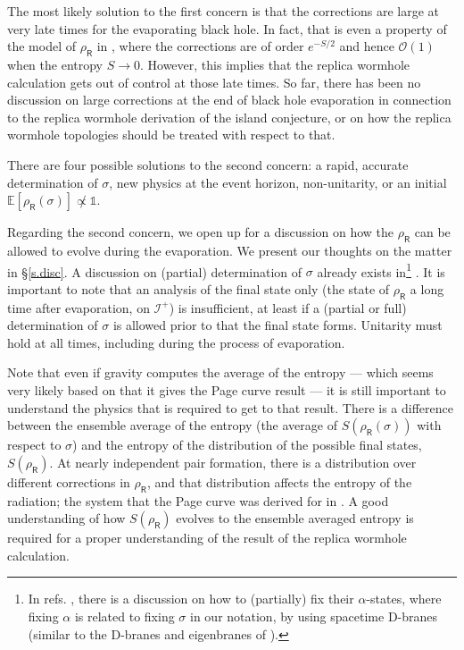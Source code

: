 \documentclass[11pt]{article}
\numberwithin{equation}{section}
\begin{document}
The most likely solution to the first concern is that the corrections are large at very late times for the evaporating black hole. In fact, that is even a property of the model of $\rho_\textsf{R}$ in \cite{Penington:2019kki}, where the corrections are of order $e^{-S/2}$ and hence $\mathcal{O}(1)$ when the entropy $S\rightarrow0$. However, this implies that the replica wormhole calculation gets out of control at those late times. So far, there has been no discussion on large corrections at the end of black hole evaporation in connection to the replica wormhole derivation of the island conjecture, or on how the replica wormhole topologies should be treated with respect to that.

There are four possible solutions to the second concern: a rapid, accurate determination of $\sigma$, new physics at the event horizon, non-unitarity, or an initial $\mathbb{E}[\rho_\textsf{R}(\sigma)]\not\propto \mathbb{1}$.

Regarding the second concern, we open up for a discussion on how the $\rho_\textsf{R}$ can be allowed to evolve during the evaporation. We present our thoughts on the matter in \S\ref{s.disc}. A discussion on (partial) determination of $\sigma$ already exists in\footnote{In refs. \cite{Marolf:2020xie,Marolf:2020rpm}, there is a discussion on how to (partially) fix their $\alpha$-states, where fixing $\alpha$ is related to fixing $\sigma$ in our notation, by using spacetime D-branes (similar to the D-branes and eigenbranes of \cite{Saad:2019lba,Blommaert:2019wfy}).} \cite{Marolf:2020xie,Marolf:2020rpm}. It is important to note that an analysis of the final state only (the state of $\rho_\textsf{R}$ a long time after evaporation, on $\mathcal{I}^+$) is insufficient, at least if a (partial or full) determination of $\sigma$ is allowed prior to that the final state forms. Unitarity must hold at all times, including during the process of evaporation.

Note that even if gravity computes the average of the entropy --- which seems very likely based on that it gives the Page curve result --- it is still important to understand the physics that is required to get to that result. There is a difference between the ensemble average of the entropy (the average of $S(\rho_\textsf{R}(\sigma))$ with respect to $\sigma$) and the entropy of the distribution of the possible final states, $S(\rho_\textsf{R})$. At nearly independent pair formation, there is a distribution over different corrections in $\rho_\textsf{R}$, and that distribution affects the entropy of the radiation; the system that the Page curve was derived for in \cite{Page:1993wv}. A good understanding of how $S(\rho_\textsf{R})$ evolves to the ensemble averaged entropy is required for a proper understanding of the result of the replica wormhole calculation.
\end{document}

